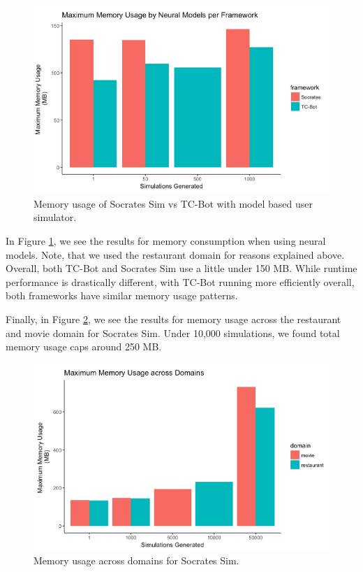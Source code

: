 \begin{figure}[h!]
		\centering
	\label{fig:mem_usage_nm}
	\includegraphics[width=\linewidth]{diagrams/mem_usage_neural.jpeg}
	\caption{ Memory usage of Socrates Sim vs TC-Bot with model based user simulator. }
\end{figure}

In Figure \ref{fig:mem_usage_nm}, we see the results for memory consumption when using neural models. Note, that we used the restaurant domain for reasons explained above. Overall, both TC-Bot and Socrates Sim use a little under 150 MB. While runtime performance is drastically different, with TC-Bot running more efficiently overall, both frameworks have similar memory usage patterns. 

Finally, in Figure \ref{fig:mem_usage_cd}, we see the results for memory usage across the restaurant and movie domain for Socrates Sim. Under 10,000 simulations, we found total memory usage caps around 250 MB. 

\begin{figure}[h!]
		\centering
	\label{fig:mem_usage_cd}
	\includegraphics[width=\linewidth]{diagrams/mem_usage_domains.jpeg}
	\caption{ Memory usage across domains for Socrates Sim.}
\end{figure}

